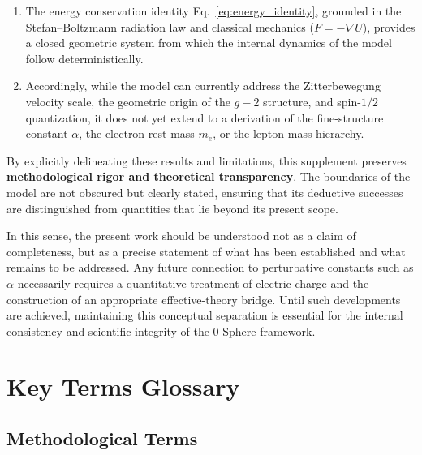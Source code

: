 \documentclass[12pt,letterpaper]{article}
\begin{document}
\begin{enumerate}
\item The energy conservation identity Eq.~\eqref{eq:energy_identity}, grounded in the Stefan--Boltzmann radiation law and classical mechanics ($F = -\nabla U$), provides a closed geometric system from which the internal dynamics of the model follow deterministically.

\item Accordingly, while the model can currently address the Zitterbewegung velocity scale, the geometric origin of the $g-2$ structure, and spin-$1/2$ quantization, it does not yet extend to a derivation of the fine-structure constant $\alpha$, the electron rest mass $m_e$, or the lepton mass hierarchy.
\end{enumerate}

By explicitly delineating these results and limitations, this supplement preserves \textbf{methodological rigor and theoretical transparency}. The boundaries of the model are not obscured but clearly stated, ensuring that its deductive successes are distinguished from quantities that lie beyond its present scope.

In this sense, the present work should be understood not as a claim of completeness, but as a precise statement of what has been established and what remains to be addressed. Any future connection to perturbative constants such as $\alpha$ necessarily requires a quantitative treatment of electric charge and the construction of an appropriate effective-theory bridge. Until such developments are achieved, maintaining this conceptual separation is essential for the internal consistency and scientific integrity of the 0-Sphere framework.



\section*{Key Terms Glossary}

\subsection*{Methodological Terms}
\end{document}
